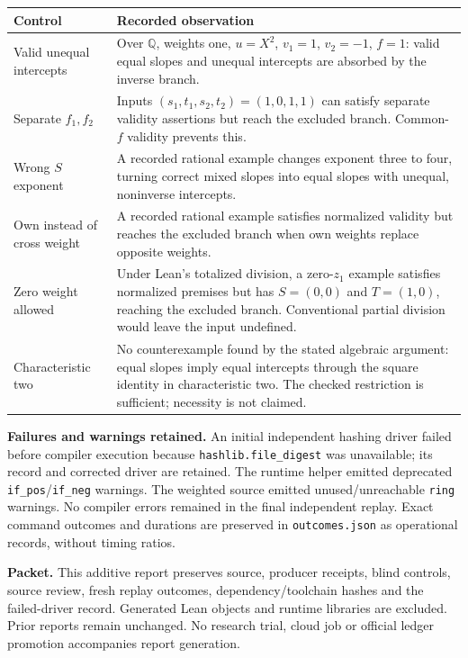\documentclass[11pt]{article}
\begin{document}
\begin{tabularx}{\textwidth}{@{}p{}X@{}}\toprule
Control & Recorded observation\\\midrule
Valid unequal intercepts & Over $\mathbb Q$, weights one, $u=X^2$, $v_1=1$, $v_2=-1$, $f=1$: valid equal slopes and unequal intercepts are absorbed by the inverse branch.\\
Separate $f_1,f_2$ & Inputs $(s_1,t_1,s_2,t_2)=(1,0,1,1)$ can satisfy separate validity assertions but reach the excluded branch. Common-$f$ validity prevents this.\\
Wrong $S$ exponent & A recorded rational example changes exponent three to four, turning correct mixed slopes into equal slopes with unequal, noninverse intercepts.\\
Own instead of cross weight & A recorded rational example satisfies normalized validity but reaches the excluded branch when own weights replace opposite weights.\\
Zero weight allowed & Under Lean's totalized division, a zero-$z_1$ example satisfies normalized premises but has $S=(0,0)$ and $T=(1,0)$, reaching the excluded branch. Conventional partial division would leave the input undefined.\\
Characteristic two & No counterexample found by the stated algebraic argument: equal slopes imply equal intercepts through the square identity in characteristic two. The checked restriction is sufficient; necessity is not claimed.\\\bottomrule
\end{tabularx}

\textbf{Failures and warnings retained.} An initial independent hashing driver failed before compiler execution because \texttt{hashlib.file\_digest} was unavailable; its record and corrected driver are retained. The runtime helper emitted deprecated \texttt{if\_pos}/\texttt{if\_neg} warnings. The weighted source emitted unused/unreachable \texttt{ring} warnings. No compiler errors remained in the final independent replay. Exact command outcomes and durations are preserved in \texttt{outcomes.json} as operational records, without timing ratios.

\textbf{Packet.} This additive report preserves source, producer receipts, blind controls, source review, fresh replay outcomes, dependency/toolchain hashes and the failed-driver record. Generated Lean objects and runtime libraries are excluded. Prior reports remain unchanged. No research trial, cloud job or official ledger promotion accompanies report generation.
\end{document}
